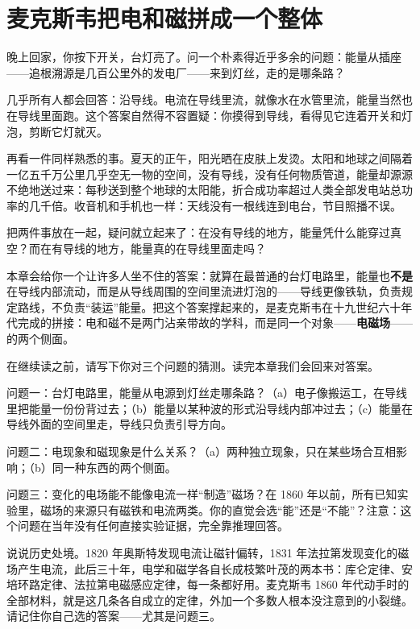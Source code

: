 \chapter{麦克斯韦把电和磁拼成一个整体}


晚上回家，你按下开关，台灯亮了。问一个朴素得近乎多余的问题：能量从插座——追根溯源是几百公里外的发电厂——来到灯丝，走的是哪条路？

几乎所有人都会回答：沿导线。电流在导线里流，就像水在水管里流，能量当然也在导线里面跑。这个答案自然得不容置疑：你摸得到导线，看得见它连着开关和灯泡，剪断它灯就灭。

再看一件同样熟悉的事。夏天的正午，阳光晒在皮肤上发烫。太阳和地球之间隔着一亿五千万公里几乎空无一物的空间，没有导线，没有任何物质管道，能量却源源不绝地送过来：每秒送到整个地球的太阳能，折合成功率超过人类全部发电站总功率的几千倍。收音机和手机也一样：天线没有一根线连到电台，节目照播不误。

把两件事放在一起，疑问就立起来了：在没有导线的地方，能量凭什么能穿过真空？而在有导线的地方，能量真的在导线里面走吗？

本章会给你一个让许多人坐不住的答案：就算在最普通的台灯电路里，能量也\textbf{不是}在导线内部流动，而是从导线周围的空间里流进灯泡的——导线更像铁轨，负责规定路线，不负责“装运”能量。把这个答案撑起来的，是麦克斯韦在十九世纪六十年代完成的拼接：电和磁不是两门沾亲带故的学科，而是同一个对象——\textbf{电磁场}——的两个侧面。


在继续读之前，请写下你对三个问题的猜测。读完本章我们会回来对答案。

问题一：台灯电路里，能量从电源到灯丝走哪条路？（a）电子像搬运工，在导线里把能量一份份背过去；（b）能量以某种波的形式沿导线内部冲过去；（c）能量在导线外面的空间里走，导线只负责引导方向。

问题二：电现象和磁现象是什么关系？（a）两种独立现象，只在某些场合互相影响；（b）同一种东西的两个侧面。

问题三：变化的电场能不能像电流一样“制造”磁场？在 1860 年以前，所有已知实验里，磁场的来源只有磁铁和电流两类。你的直觉会选“能”还是“不能”？注意：这个问题在当年没有任何直接实验证据，完全靠推理回答。

说说历史处境。1820 年奥斯特发现电流让磁针偏转，1831 年法拉第发现变化的磁场产生电流，此后三十年，电学和磁学各自长成枝繁叶茂的两本书：库仑定律、安培环路定律、法拉第电磁感应定律，每一条都好用。麦克斯韦 1860 年代动手时的全部材料，就是这几条各自成立的定律，外加一个多数人根本没注意到的小裂缝。请记住你自己选的答案——尤其是问题三。

